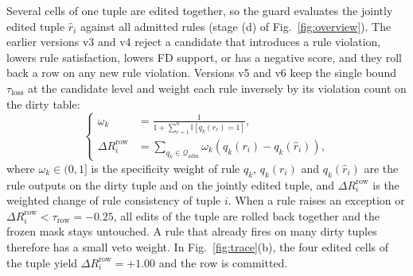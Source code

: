 \documentclass[conference]{IEEEtran}
\begin{document}
Several cells of one tuple are edited together, so the guard evaluates the jointly edited tuple $\hat{r}_i$ against all admitted rules (stage (d) of Fig.~\ref{fig:overview}). The earlier versions v3 and v4 reject a candidate that introduces a rule violation, lowers rule satisfaction, lowers FD support, or has a negative score, and they roll back a row on any new rule violation. Versions v5 and v6 keep the single bound $\tau_{\mathrm{loss}}$ at the candidate level and weight each rule inversely by its violation count on the dirty table:
\begin{equation}
\label{eq:row_guard}
\left\{
\begin{aligned}
\omega_k &= \frac{1}{1 + \sum_{r=1}^{n} \mathbb{I}\!\left[q_k(r_r) = 1\right]}, \\
\Delta R_i^{\mathrm{row}} &= \sum_{q_k \in \mathcal{Q}_{\mathrm{adm}}} \omega_k \!\left(q_k(r_i) - q_k(\hat{r}_i)\right),
\end{aligned}
\right.
\end{equation}
where $\omega_k \in (0,1]$ is the specificity weight of rule $q_k$, $q_k(r_i)$ and $q_k(\hat{r}_i)$ are the rule outputs on the dirty tuple and on the jointly edited tuple, and $\Delta R_i^{\mathrm{row}}$ is the weighted change of rule consistency of tuple $i$. When a rule raises an exception or $\Delta R_i^{\mathrm{row}} < \tau_{\mathrm{row}} = -0.25$, all edits of the tuple are rolled back together and the frozen mask stays untouched. A rule that already fires on many dirty tuples therefore has a small veto weight. In Fig.~\ref{fig:trace}(b), the four edited cells of the tuple yield $\Delta R_i^{\mathrm{row}} = +1.00$ and the row is committed.
\end{document}
